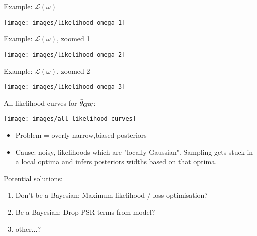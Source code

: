 \documentclass[10pt]{beamer}
\begin{document}
\begin{frame}{}
	
	Example: $\mathcal{L}(\omega)$
	
	\texttt{[image: images/likelihood\_omega\_1]}

	
\end{frame}


\begin{frame}{}
	
	Example: $\mathcal{L}(\omega)$, zoomed 1
	
	\texttt{[image: images/likelihood\_omega\_2]}
	
	
\end{frame}


\begin{frame}{}
	
	Example: $\mathcal{L}(\omega)$, zoomed 2
	
	\texttt{[image: images/likelihood\_omega\_3]}
	
	
\end{frame}


\begin{frame}{}
	
	All likelihood curves for $\bar{\theta}_{\rm GW}$:
	
	\texttt{[image: images/all\_likelihood\_curves]}
	
	
\end{frame}



\begin{frame}{}
	
		\begin{itemize}
		\item \alert{Problem} = overly narrow,biased posteriors
		\item Cause: noisy, likelihoods which are "locally Gaussian". Sampling gets stuck in a local optima and infers posteriors widths based on that optima. 
	\end{itemize}
	
	
	
\end{frame}


\begin{frame}{}
	Potential solutions:
	
	\begin{enumerate}
		\item Don't be a Bayesian: Maximum likelihood / loss optimisation? 
		\item Be a Bayesian: Drop PSR terms from model?
		\item other...?
	\end{enumerate}
	
	
\end{frame}
\end{document}
